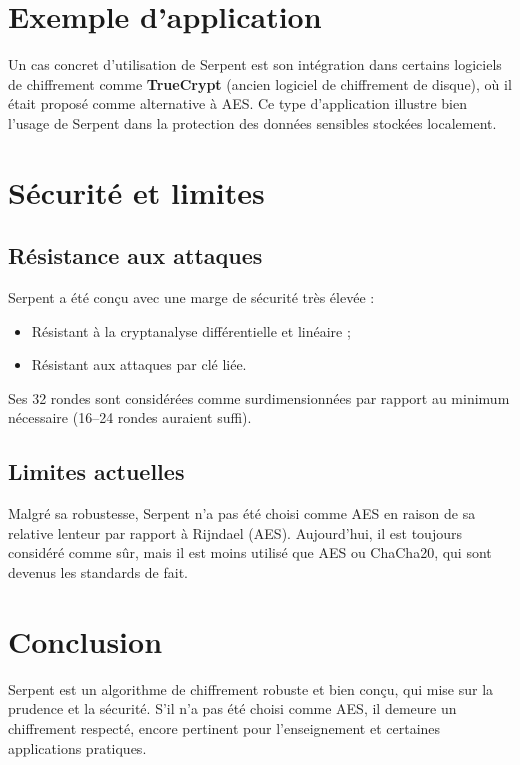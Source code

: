 \documentclass[12pt,a4paper]{report}
\begin{document}
\chapter*{Exemple d’application}

Un cas concret d’utilisation de Serpent est son intégration dans certains logiciels de chiffrement comme \textbf{TrueCrypt} (ancien logiciel de chiffrement de disque), où il était proposé comme alternative à AES.  
Ce type d’application illustre bien l’usage de Serpent dans la protection des données sensibles stockées localement.

\chapter*{Sécurité et limites}

\setcounter{section}{0}

\section{Résistance aux attaques}
Serpent a été conçu avec une marge de sécurité très élevée :
\begin{itemize}
    \item Résistant à la cryptanalyse différentielle et linéaire ;
    \item Résistant aux attaques par clé liée.
\end{itemize}
Ses 32 rondes sont considérées comme surdimensionnées par rapport au minimum nécessaire (16–24 rondes auraient suffi).

\section{Limites actuelles}

Malgré sa robustesse, Serpent n’a pas été choisi comme AES en raison de sa relative lenteur par rapport à Rijndael (AES).  
Aujourd’hui, il est toujours considéré comme sûr, mais il est moins utilisé que AES ou ChaCha20, qui sont devenus les standards de fait.

\chapter*{Conclusion}

Serpent est un algorithme de chiffrement robuste et bien conçu, qui mise sur la prudence et la sécurité.  
S’il n’a pas été choisi comme AES, il demeure un chiffrement respecté, encore pertinent pour l’enseignement et certaines applications pratiques.
\end{document}
